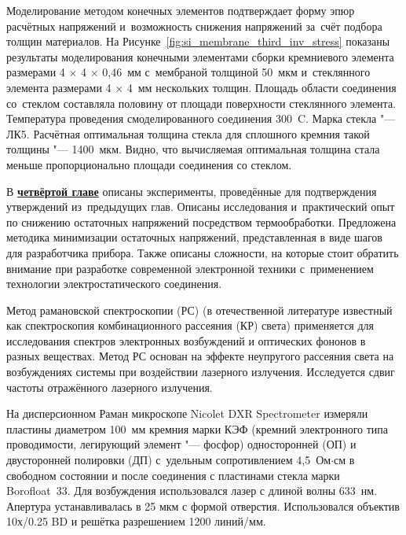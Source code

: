 Моделирование методом конечных элементов
подтверждает форму эпюр расчётных напряжений
и~возможность снижения напряжений за~счёт подбора толщин материалов.
На Рисунке~\ref{fig:si_membrane_third_inv_stress} показаны результаты
моделирования конечными элементами сборки кремниевого элемента
размерами \mbox{4\(\,\times\,\)4\(\,\times\,\)0,46 мм} с~мембраной толщиной
50~мкм и~стеклянного элемента размерами \mbox{4\(\,\times\,\)4 мм} нескольких толщин.
Площадь области соединения со~стеклом составляла половину от
площади поверхности стеклянного элемента.
Температура проведения смоделированного соединения %
300~{\textdegree}C. Марка стекла "--- ЛК5.
Расчётная оптимальная толщина стекла для сплошного кремния такой
толщины "--- 1400~мкм.
Видно, что вычисляемая оптимальная толщина стала меньше
пропорционально площади соединения со стеклом.

В \underline{\textbf{четвёртой главе}} описаны эксперименты,
проведённые для подтверждения утверждений из~предыдущих глав. Описаны
исследования и~практический опыт по снижению остаточных напряжений
посредством термообработки. Предложена методика минимизации остаточных
напряжений, представленная в виде шагов для разработчика прибора.
Также описаны сложности, на которые стоит обратить внимание при
разработке современной электронной техники с~применением технологии
электростатического соединения.

Метод рамановской спектроскопии (РС) (в отечественной литературе
известный как спектроскопия комбинационного рассеяния (КР)
света) применяется для исследования спектров электронных возбуждений и
оптических фононов в разных веществах.
Метод РС основан на эффекте неупругого рассеяния света на возбуждениях
системы при воздействии лазерного излучения. Исследуется сдвиг частоты
отражённого лазерного излучения.

На дисперсионном Раман микроскопе Nicolet DXR Spectrometer
измеряли пластины диаметром 100~мм кремния марки КЭФ (кремний
электронного типа проводимости, легирующий элемент "--- фосфор)
односторонней (ОП) и двусторонней полировки (ДП) с~удельным
сопротивлением 4,5~Ом$\cdot$см в свободном состоянии и после
соединения с пластинами стекла марки Borofloat~33.
Для возбуждения использовался лазер с длиной волны 633~нм. Апертура
устанавливалась в 25 мкм с формой отверстия. Использовался объектив
10х/0.25 BD и решётка разрешением 1200 линий/мм.

